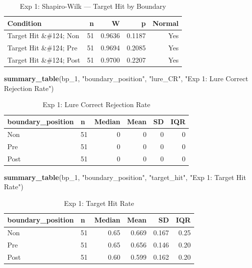 \documentclass[
]{article}
\newenvironment{Shaded}{\begin{snugshade}}{\end{snugshade}}
\newcommand{\FunctionTok}[1]{\textcolor[rgb]{0.13,0.29,0.53}{\textbf{#1}}}
\newcommand{\NormalTok}[1]{#1}
\newcommand{\StringTok}[1]{\textcolor[rgb]{0.31,0.60,0.02}{#1}}
\begin{document}
\begingroup\fontsize{12}{14}\selectfont

\begin{longtable}[t]{lrrrr}
\caption{\label{tab:exp1_acc_normality}Exp 1: Shapiro-Wilk — Target Hit by Boundary}\\
\toprule
Condition & n & W & p & Normal\\
\midrule
Target Hit \&\#124; Non & 51 & 0.9636 & 0.1187 & Yes\\
Target Hit \&\#124; Pre & 51 & 0.9694 & 0.2085 & Yes\\
Target Hit \&\#124; Post & 51 & 0.9700 & 0.2207 & Yes\\
\bottomrule
\end{longtable}
\endgroup{}

\begin{Shaded}
\begin{Highlighting}[]
\FunctionTok{summary\_table}\NormalTok{(bp\_1, }\StringTok{"boundary\_position"}\NormalTok{, }\StringTok{"lure\_CR"}\NormalTok{,}
              \StringTok{"Exp 1: Lure Correct Rejection Rate"}\NormalTok{)}
\end{Highlighting}
\end{Shaded}

\begingroup\fontsize{12}{14}\selectfont

\begin{longtable}[t]{llrrrr}
\caption{\label{tab:exp1_acc_desc}Exp 1: Lure Correct Rejection Rate}\\
\toprule
boundary\_position & n & Median & Mean & SD & IQR\\
\midrule
Non & 51 & 0 & 0 & 0 & 0\\
Pre & 51 & 0 & 0 & 0 & 0\\
Post & 51 & 0 & 0 & 0 & 0\\
\bottomrule
\end{longtable}
\endgroup{}

\begin{Shaded}
\begin{Highlighting}[]
\FunctionTok{summary\_table}\NormalTok{(bp\_1, }\StringTok{"boundary\_position"}\NormalTok{, }\StringTok{"target\_hit"}\NormalTok{,}
              \StringTok{"Exp 1: Target Hit Rate"}\NormalTok{)}
\end{Highlighting}
\end{Shaded}

\begingroup\fontsize{12}{14}\selectfont

\begin{longtable}[t]{llrrrr}
\caption{\label{tab:exp1_acc_desc}Exp 1: Target Hit Rate}\\
\toprule
boundary\_position & n & Median & Mean & SD & IQR\\
\midrule
Non & 51 & 0.65 & 0.669 & 0.167 & 0.25\\
Pre & 51 & 0.65 & 0.656 & 0.146 & 0.20\\
Post & 51 & 0.60 & 0.599 & 0.162 & 0.20\\
\bottomrule
\end{longtable}
\endgroup{}
\end{document}
